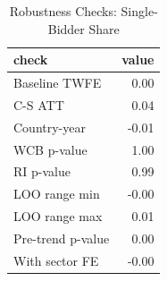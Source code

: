 \begin{table}[ht]
\centering
\begin{tabular}{lr}
  \hline
check & value \\ 
  \hline
Baseline TWFE & 0.00 \\ 
  C-S ATT & 0.04 \\ 
  Country-year & -0.01 \\ 
  WCB p-value & 1.00 \\ 
  RI p-value & 0.99 \\ 
  LOO range min & -0.00 \\ 
  LOO range max & 0.01 \\ 
  Pre-trend p-value & 0.00 \\ 
  With sector FE & -0.00 \\ 
   \hline
\end{tabular}
\caption{Robustness Checks: Single-Bidder Share} 
\label{tab:robustness}
\end{table}
